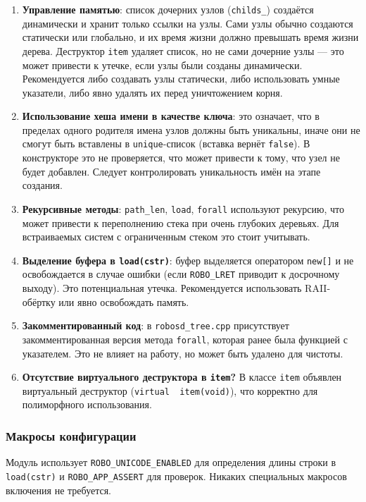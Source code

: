 \documentclass[a4paper,12pt]{article}
\begin{document}
\begin{enumerate}
    \item \textbf{Управление памятью}: список дочерних узлов (\texttt{childs\_}) создаётся динамически и хранит только ссылки на узлы. Сами узлы обычно создаются статически или глобально, и их время жизни должно превышать время жизни дерева. Деструктор \texttt{item} удаляет список, но не сами дочерние узлы — это может привести к утечке, если узлы были созданы динамически. Рекомендуется либо создавать узлы статически, либо использовать умные указатели, либо явно удалять их перед уничтожением корня.
    \item \textbf{Использование хеша имени в качестве ключа}: это означает, что в пределах одного родителя имена узлов должны быть уникальны, иначе они не смогут быть вставлены в \texttt{unique}-список (вставка вернёт \texttt{false}). В конструкторе это не проверяется, что может привести к тому, что узел не будет добавлен. Следует контролировать уникальность имён на этапе создания.
    \item \textbf{Рекурсивные методы}: \texttt{path\_len}, \texttt{load}, \texttt{forall} используют рекурсию, что может привести к переполнению стека при очень глубоких деревьях. Для встраиваемых систем с ограниченным стеком это стоит учитывать.
    \item \textbf{Выделение буфера в \texttt{load(cstr)}}: буфер выделяется оператором \texttt{new[]} и не освобождается в случае ошибки (если \texttt{ROBO\_LRET} приводит к досрочному выходу). Это потенциальная утечка. Рекомендуется использовать RAII-обёртку или явно освобождать память.
    \item \textbf{Закомментированный код}: в \texttt{robosd\_tree.cpp} присутствует закомментированная версия метода \texttt{forall}, которая ранее была функцией с указателем. Это не влияет на работу, но может быть удалено для чистоты.
    \item \textbf{Отсутствие виртуального деструктора в \texttt{item}?} В классе \texttt{item} объявлен виртуальный деструктор (\texttt{virtual ~item(void)}), что корректно для полиморфного использования.
\end{enumerate}

\subsubsection{Макросы конфигурации}

Модуль использует \texttt{ROBO\_UNICODE\_ENABLED} для определения длины строки в \texttt{load(cstr)} и \texttt{ROBO\_APP\_ASSERT} для проверок. Никаких специальных макросов включения не требуется.
\end{document}
